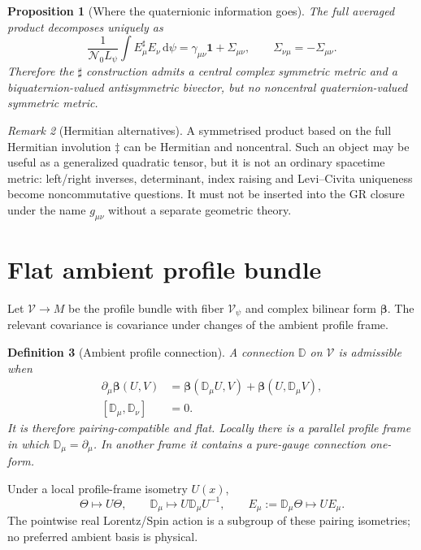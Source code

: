 \documentclass[11pt,a4paper]{article}
\newtheorem{definition}{Definition}[section]
\newtheorem{proposition}[definition]{Proposition}
\theoremstyle{remark}
\newtheorem{remark}[definition]{Remark}
\newcommand{\V}{\mathscr V_\psi}
\newcommand{\Nzero}{\mathcal N_0}
\newcommand{\one}{\mathbf 1}
\newcommand{\dd}{\mathrm d}
\newcommand{\Db}{\mathbb D}
\newcommand{\betaC}{\boldsymbol\beta}
\begin{document}
\begin{proposition}[Where the quaternionic information goes]
The full averaged product decomposes uniquely as
\begin{equation}
 \frac1{\Nzero L_\psi}\int E_\mu^\sharp E_\nu\,\dd\psi
 =\gamma_{\mu\nu}\one+\Sigma_{\mu\nu},
 \qquad \Sigma_{\nu\mu}=-\Sigma_{\mu\nu}.
 \label{eq:fullsplit}
\end{equation}
Therefore the $\sharp$ construction admits a central complex symmetric metric
and a biquaternion-valued antisymmetric bivector, but no noncentral
quaternion-valued symmetric metric.
\end{proposition}

\begin{remark}[Hermitian alternatives]
A symmetrised product based on the full Hermitian involution $\ddagger$ can be
Hermitian and noncentral.  Such an object may be useful as a generalized
quadratic tensor, but it is not an ordinary spacetime metric: left/right
inverses, determinant, index raising and Levi--Civita uniqueness become
noncommutative questions.  It must not be inserted into the GR closure under
the name $g_{\mu\nu}$ without a separate geometric theory.
\end{remark}

\section{Flat ambient profile bundle}

Let $\mathcal V\to M$ be the profile bundle with fiber $\V$ and complex
bilinear form $\betaC$.  The relevant covariance is covariance under changes
of the ambient profile frame.

\begin{definition}[Ambient profile connection]
A connection $\Db$ on $\mathcal V$ is admissible when
\begin{align}
 \partial_\mu\betaC(U,V)
 &=\betaC(\Db_\mu U,V)+\betaC(U,\Db_\mu V),
 \label{eq:betacompat}\\
 [\Db_\mu,\Db_\nu]&=0.
 \label{eq:flatambient}
\end{align}
It is therefore pairing-compatible and flat.  Locally there is a parallel
profile frame in which $\Db_\mu=\partial_\mu$.  In another frame it contains a
pure-gauge connection one-form.
\end{definition}

Under a local profile-frame isometry $U(x)$,
\[
 \Theta\mapsto U\Theta,\qquad
 \Db_\mu\mapsto U\Db_\mu U^{-1},\qquad
 E_\mu:=\Db_\mu\Theta\mapsto UE_\mu.
\]
The pointwise real Lorentz/Spin action is a subgroup of these pairing
isometries; no preferred ambient basis is physical.
\end{document}
